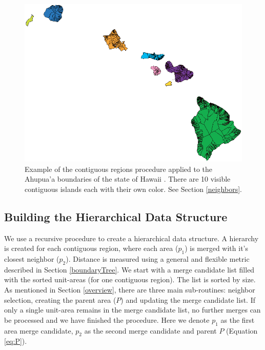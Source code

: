 \begin{figure}
\centering
\includegraphics[width=.5\linewidth]{images/ahupuaa} 
\caption{Example of the contiguous regions procedure applied to the Ahupua'a boundaries of the state of Hawaii \cite{hawaii}. There are 10 visible contiguous islands each with their own color. See Section \ref{neighbors}.
} \label{fig:contiguous} \vspace{-0.2cm}
\end{figure}


\subsection{Building the Hierarchical Data Structure}
We use a recursive procedure to create a hierarchical data structure. A hierarchy is created for each contiguous region, where each area ($p_1$) is merged with it's closest neighbor ($p_2$). Distance is measured using a general and flexible metric described in Section \ref{boundaryTree}. We start with a merge candidate list filled with the sorted unit-areas (for one contiguous region). The list is sorted by size. As mentioned in Section \ref{overview}, there are three main sub-routines: neighbor selection, creating the parent area ($P$) and updating the merge candidate list. If only a single unit-area remains in the merge candidate list, no further merges can be processed and we have finished the procedure. Here we denote $p_1$ as the first area merge candidate, $p_2$ as the second merge candidate and parent $P$ (Equation \ref{eq:P}).


